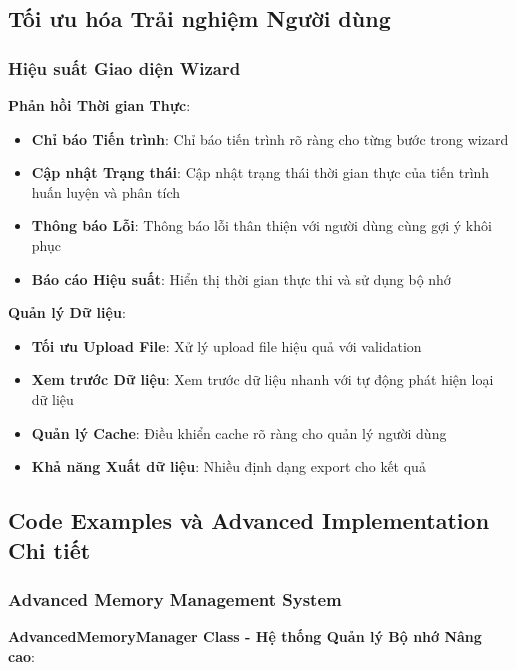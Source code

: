 \subsection{Tối ưu hóa Trải nghiệm Người dùng}\label{subsec:ux-optimization}

\subsubsection{Hiệu suất Giao diện Wizard}

\textbf{Phản hồi Thời gian Thực}:
        \begin{itemize}
    \item \textbf{Chỉ báo Tiến trình}: Chỉ báo tiến trình rõ ràng cho từng bước trong wizard
    \item \textbf{Cập nhật Trạng thái}: Cập nhật trạng thái thời gian thực của tiến trình huấn luyện và phân tích
    \item \textbf{Thông báo Lỗi}: Thông báo lỗi thân thiện với người dùng cùng gợi ý khôi phục
    \item \textbf{Báo cáo Hiệu suất}: Hiển thị thời gian thực thi và sử dụng bộ nhớ
        \end{itemize}

\textbf{Quản lý Dữ liệu}:
\begin{itemize}
    \item \textbf{Tối ưu Upload File}: Xử lý upload file hiệu quả với validation
    \item \textbf{Xem trước Dữ liệu}: Xem trước dữ liệu nhanh với tự động phát hiện loại dữ liệu
    \item \textbf{Quản lý Cache}: Điều khiển cache rõ ràng cho quản lý người dùng
    \item \textbf{Khả năng Xuất dữ liệu}: Nhiều định dạng export cho kết quả
\end{itemize}

\subsection{Code Examples và Advanced Implementation Chi tiết}

\subsubsection{Advanced Memory Management System}

\textbf{AdvancedMemoryManager Class - Hệ thống Quản lý Bộ nhớ Nâng cao}:

